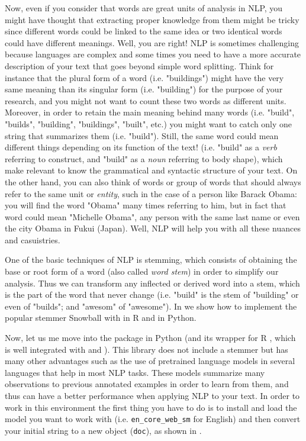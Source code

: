 Now, even if you consider that words are great units of analysis in NLP, you might have thought that extracting proper knowledge from them might be tricky since different words could be linked to the same idea or two identical words could have different meanings. Well, you are right! NLP is sometimes challenging because languages are complex and some times you need to have a more accurate description of your text that goes beyond simple word splitting. Think for instance that the plural form of a word (i.e. "buildings") might have the very same meaning than its singular form (i.e. "building") for the purpose of your research, and you might not want to count these two words as different units. Moreover, in order to retain the main meaning behind many words (i.e. "build", "builds", "building", "buildings", "built", etc.) you might want to catch only one string that summarizes them (i.e. "build"). Still, the same word could mean different things depending on its function of the text! (i.e. "build" as a \textit{verb} referring to construct, and "build" as a \textit{noun} referring to body shape), which make relevant to know the grammatical and syntactic structure of your text. On the other hand, you can also think of words or group of words that should always refer to the same unit or \textit{entity}, such in the case of a person like Barack Obama: you will find the word "Obama" many times referring to him, but in fact that word could mean "Michelle Obama", any person with the same last name or even the city Obama in Fukui (Japan). Well, NLP will help you with all these nuances and casuistries. 

One of the basic techniques of NLP is stemming, which consists of obtaining the base or root form of a word (also called \textit{word stem}) in order to simplify our analysis. Thus we can transform any inflected or derived word into a stem, which is the part of the word that never change (i.e. "build" is the stem of "building" or even of "builds"; and "awesom" of "awesome"). In  we show how to implement the popular stemmer Snowball with  in R and  in Python.


Now, let us me move into the package  in Python (and its wrapper for R , which is well integrated with  and ). This library does not include a stemmer but has many other advantages such as the use of pretrained language models in several languages that help in most NLP tasks. These models summarize many observations to previous annotated examples in order to learn from them, and thus can have a better performance when applying NLP to your text. In order to work in this environment the first thing you have to do is to install and load the model you want to work with (i.e. \verb|en_core_web_sm| for English) and then convert your initial string to a new  object (\verb|doc|), as shown in .

